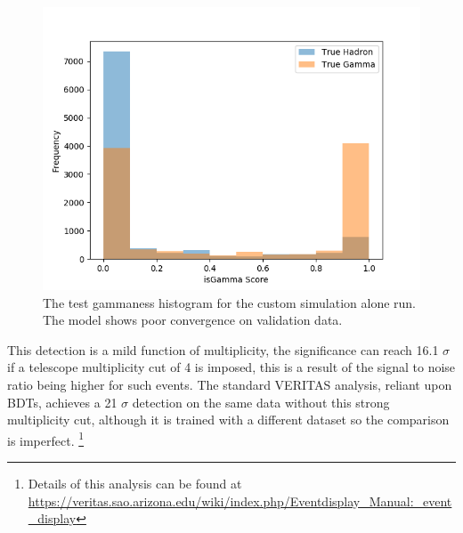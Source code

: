 \begin{figure}[] 
        \centering \includegraphics[width=\columnwidth]{figures/crabrun2_hist.png}

        \caption{
                \label{fig:cr2_hist} The test gammaness histogram for the custom simulation alone run. The model shows poor convergence on validation data.
        }
\end{figure}
\begin{table}[h]
    \centering
    \caption{Anasum output for the opt4 run, without applying a strenuous multiplicity cut.}
    \label{table:opt4}
\end{table}

This detection is a mild function of multiplicity, the significance can reach 16.1 $\sigma$ if a telescope multiplicity cut of 4 is imposed, this is a result of the signal to noise ratio being higher for such events. The standard VERITAS analysis, reliant upon BDTs, achieves a 21 $\sigma$ detection on the same data without this strong multiplicity cut, although it is trained with a different dataset so the comparison is imperfect. \footnote{Details of this analysis can be found at \url{https://veritas.sao.arizona.edu/wiki/index.php/Eventdisplay_Manual:_event_display}}

